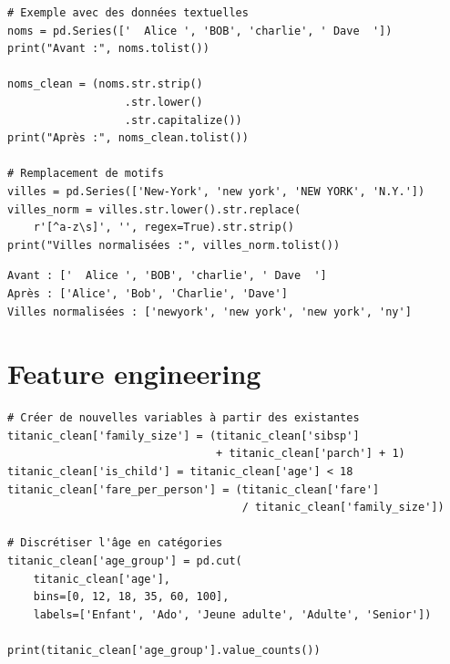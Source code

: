 \begin{codeblock}[title=\textbf{Python}]
\begin{verbatim}
# Exemple avec des données textuelles
noms = pd.Series(['  Alice ', 'BOB', 'charlie', ' Dave  '])
print("Avant :", noms.tolist())

noms_clean = (noms.str.strip()
                  .str.lower()
                  .str.capitalize())
print("Après :", noms_clean.tolist())

# Remplacement de motifs
villes = pd.Series(['New-York', 'new york', 'NEW YORK', 'N.Y.'])
villes_norm = villes.str.lower().str.replace(
    r'[^a-z\s]', '', regex=True).str.strip()
print("Villes normalisées :", villes_norm.tolist())
\end{verbatim}
\end{codeblock}

\begin{codeoutput}
\begin{verbatim}
Avant : ['  Alice ', 'BOB', 'charlie', ' Dave  ']
Après : ['Alice', 'Bob', 'Charlie', 'Dave']
Villes normalisées : ['newyork', 'new york', 'new york', 'ny']
\end{verbatim}
\end{codeoutput}

\section{Feature engineering}

\begin{codeblock}[title=\textbf{Python}]
\begin{verbatim}
# Créer de nouvelles variables à partir des existantes
titanic_clean['family_size'] = (titanic_clean['sibsp']
                                + titanic_clean['parch'] + 1)
titanic_clean['is_child'] = titanic_clean['age'] < 18
titanic_clean['fare_per_person'] = (titanic_clean['fare']
                                    / titanic_clean['family_size'])

# Discrétiser l'âge en catégories
titanic_clean['age_group'] = pd.cut(
    titanic_clean['age'],
    bins=[0, 12, 18, 35, 60, 100],
    labels=['Enfant', 'Ado', 'Jeune adulte', 'Adulte', 'Senior'])

print(titanic_clean['age_group'].value_counts())
\end{verbatim}
\end{codeblock}

